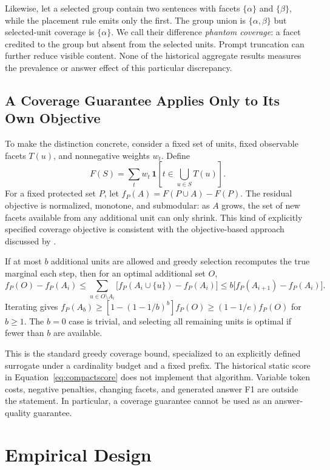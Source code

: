 \documentclass[11pt,a4paper]{article}
\begin{document}
Likewise, let a selected group contain two sentences with facets
$\{\alpha\}$ and $\{\beta\}$, while the placement rule emits only the first.
The group union is $\{\alpha,\beta\}$ but selected-unit coverage is
$\{\alpha\}$. We call their difference \emph{phantom coverage}: a facet
credited to the group but absent from the selected units. Prompt truncation
can further reduce visible content. None of the historical aggregate results
measures the prevalence or answer effect of this particular discrepancy.

\subsection{A Coverage Guarantee Applies Only to Its Own Objective}
To make the distinction concrete, consider a fixed set of units, fixed
observable facets $T(u)$, and nonnegative weights $w_t$. Define
\begin{equation}
F(S)=\sum_t w_t\,\mathbf{1}\left[t\in\bigcup_{u\in S}T(u)\right].
\end{equation}
For a fixed protected set $P$, let $f_P(A)=F(P\cup A)-F(P)$.
The residual objective is normalized, monotone, and submodular: as $A$ grows,
the set of new facets available from any additional unit can only shrink.
This kind of explicitly specified coverage objective is consistent with the
objective-based approach discussed by \citet{lin2011submodular}.

If at most $b$ additional units are allowed and greedy selection recomputes
the true marginal each step, then for an optimal additional set $O$,
\begin{equation}
f_P(O)-f_P(A_i)\leq
\sum_{u\in O\setminus A_i}\big[f_P(A_i\cup\{u\})-f_P(A_i)\big]
\leq b\big[f_P(A_{i+1})-f_P(A_i)\big].
\end{equation}
Iterating gives
$f_P(A_b)\geq[1-(1-1/b)^b]f_P(O)\geq(1-1/e)f_P(O)$ for $b\geq1$.
The $b=0$ case is trivial, and selecting all remaining units is optimal if
fewer than $b$ are available.

This is the standard greedy coverage bound, specialized to an explicitly defined surrogate under a
cardinality budget and a fixed prefix. The historical static score in
Equation~\ref{eq:compactscore} does not implement that algorithm.
Variable token costs, negative penalties, changing facets, and generated
answer F1 are outside the statement. In particular, a coverage guarantee
cannot be used as an answer-quality guarantee.

\section{Empirical Design}
\end{document}
